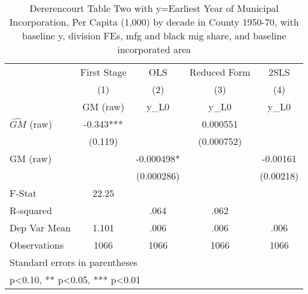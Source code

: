 \begin{table}[htbp]\centering
\def\sym#1{\ifmmode^{#1}\else\(^{#1}\)\fi}
\caption{Dererencourt Table Two with y=Earliest Year of Municipal Incorporation, Per Capita (1,000) by decade in County 1950-70, with baseline y, division FEs, mfg and black mig share, and baseline incorporated area}
\begin{tabular}{l*{4}{c}}
\toprule
                    & First Stage   &         OLS   &Reduced Form   &        2SLS   \\
                    &\multicolumn{1}{c}{(1)}&\multicolumn{1}{c}{(2)}&\multicolumn{1}{c}{(3)}&\multicolumn{1}{c}{(4)}\\
                    &\multicolumn{1}{c}{GM  (raw)}&\multicolumn{1}{c}{y\_L0}&\multicolumn{1}{c}{y\_L0}&\multicolumn{1}{c}{y\_L0}\\
\midrule
$\hat{GM}$ (raw)    &      -0.343***&               &    0.000551   &               \\
                    &     (0.119)   &               &  (0.000752)   &               \\
\addlinespace
GM  (raw)           &               &   -0.000498*  &               &    -0.00161   \\
                    &               &  (0.000286)   &               &   (0.00218)   \\
\midrule
F-Stat              &       22.25   &               &               &               \\
R-squared           &               &        .064   &        .062   &               \\
Dep Var Mean        &       1.101   &        .006   &        .006   &        .006   \\
Observations        &        1066   &        1066   &        1066   &        1066   \\
\bottomrule
\multicolumn{5}{l}{\footnotesize Standard errors in parentheses}\\
\multicolumn{5}{l}{\footnotesize * p<0.10, ** p<0.05, *** p<0.01}\\
\end{tabular}
\end{table}
